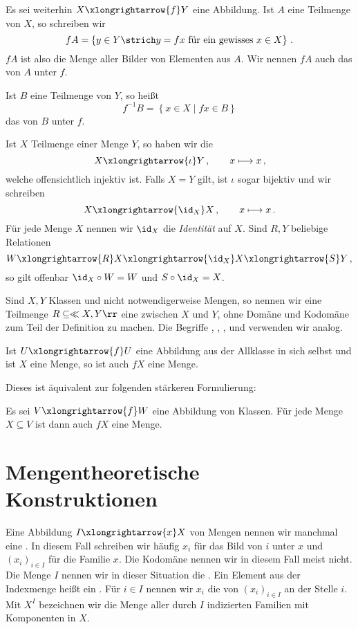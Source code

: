 Es sei weiterhin $X\xlongrightarrow{f}Y$ eine Abbildung. Ist $A$ eine Teilmenge von $X$, so schreiben wir 
\[fA=\left\{y\in Y\strich y=fx\textnormal{ für ein gewisses }x\in X\right\}\,.\]
$fA$ ist also die Menge aller Bilder von Elementen aus $A$. Wir nennen $fA$ auch das  von $A$ unter $f$.

Ist $B$ eine Teilmenge von $Y$, so heißt
\[
f^{-1}B=\left\{x\in X\mid fx\in B\right\}
\]
das  von $B$ unter $f$.

\begin{bsp}
Ist $X$ Teilmenge einer Menge $Y$, so haben wir die 
\[
X\xlongrightarrow{\iota}Y\,,\qquad x\longmapsto x\,,
\]
welche offensichtlich injektiv ist. Falls $X=Y$ gilt, ist $\iota$ sogar bijektiv und wir schreiben
\[
X\xlongrightarrow{\id_X}X\,,\qquad x\longmapsto x\,.
\]
Für jede Menge $X$ nennen wir $\id_X$ die \emph{Identität} auf $X$. Sind $R,Y$ beliebige Relationen
\[
W\xlongrightarrow{R}X\xlongrightarrow{\id_X}X\xlongrightarrow{S}Y\,,
\]
so gilt offenbar $\id_X\circ W=W$ und $S\circ\id_X=X$.
\end{bsp}

Sind $X,Y$ Klassen und nicht notwendigerweise Mengen, so nennen wir eine Teilmenge $R\subseteq\ll X,Y\rr$ eine  zwischen $X$ und $Y$, ohne Domäne und Kodomäne zum Teil der Definition zu machen. Die Begriffe , , ,  und  verwenden wir analog.

\begin{axiom}
Ist $U\xlongrightarrow{f}U$ eine Abbildung aus der Allklasse in sich selbst und ist $X$ eine Menge, so ist auch $fX$ eine Menge.
\end{axiom}

Dieses  ist äquivalent zur folgenden stärkeren Formulierung:

\begin{auf}
Es sei $V\xlongrightarrow{f}W$ eine Abbildung von Klassen. Für jede Menge $X\subseteq V$ ist dann auch $fX$ eine Menge. 
\end{auf}

\section{Mengentheoretische Konstruktionen}

Eine Abbildung $I\xlongrightarrow{x}X$ von Mengen nennen wir manchmal eine . In diesem Fall schreiben wir häufig $x_i$ für das Bild von $i$ unter $x$ und $(x_i)_{i\in I}$ für die Familie $x$. Die Kodomäne nennen wir in diesem Fall meist nicht. Die Menge $I$ nennen wir in dieser Situation die . Ein Element aus der Indexmenge heißt ein . Für $i\in I$ nennen wir $x_i$ die  von $(x_i)_{i\in I}$ an der Stelle $i$. Mit $X^I$ bezeichnen wir die Menge aller durch $I$ indizierten Familien mit Komponenten in $X$. 

